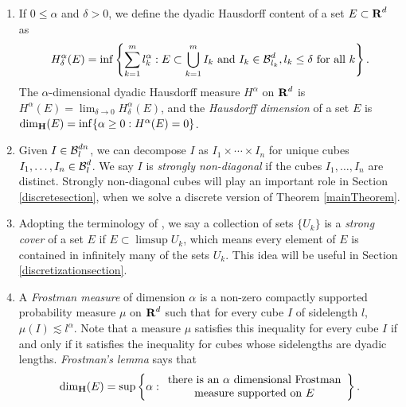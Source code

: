 \begin{enumerate}
	\item If $0 \leq \alpha$ and $\delta > 0$, we define the dyadic Hausdorff content of a set $E\subset\operatorname{\mathbf{R}}^d$ as 
	\[ H^\alpha_\delta(E) = \inf \left\{ \sum_{k = 1}^m l_k^\alpha : E \subset \bigcup_{k = 1}^m I_k\ \text{and}\ I_k \in \operatorname{\mathcal{B}}^d_{l_k}, l_k \leq \delta\ \text{for all $k$} \right\}. \]
	The $\alpha$-dimensional dyadic Hausdorff measure $H^\alpha$ on $\operatorname{\mathbf{R}}^d$ is $H^\alpha(E) = \lim_{\delta \to 0} H_\delta^\alpha(E)$, and the {\it Hausdorff dimension} of a set $E$ is $\operatorname{\dim_{\mathbf{H}}}(E) = \inf \{ \alpha \geq 0 : H^\alpha(E) = 0 \}$.
%
%
	\item \label{stronglyNonDiagonalDef}Given $I \in \operatorname{\mathcal{B}}^{dn}_l$, we can decompose $I$ as $I_1 \times \cdots \times I_n$ for unique cubes $I_1, \dots, I_n \in \operatorname{\mathcal{B}}_l^d$. We say $I$ is {\it strongly non-diagonal} if the cubes $I_1, \dots, I_n$ are distinct. Strongly non-diagonal cubes will play an important role in Section \ref{discretesection}, when we solve a discrete version of Theorem \ref{mainTheorem}.
%
%
	\item\label{strongCoverDefn} Adopting the terminology of \cite{KatzTao}, we say a collection of sets $\{ U_k \}$ is a {\it strong cover} of a set $E$ if $E \subset \limsup U_k$, which means every element of $E$ is contained in infinitely many of the sets $U_k$. This idea will be useful in Section \ref{discretizationsection}.  
%
%
	\item\label{frostmanItem} A {\it Frostman measure} of dimension $\alpha$ is a non-zero compactly supported probability measure $\mu$ on $\operatorname{\mathbf{R}}^d$ such that for every cube $I$ of sidelength $l$, $\mu(I) \lesssim l^\alpha$. Note that a measure $\mu$ satisfies this inequality for every cube $I$ if and only if it satisfies the inequality for cubes whose sidelengths are dyadic lengths. {\it Frostman's lemma} says that
	\[ \operatorname{\dim_{\mathbf{H}}}(E) = \sup \left\{ \alpha: \begin{array}{c} \text{there is an}\ \alpha\ \text{dimensional Frostman}\\
	\text{measure supported on $E$} \end{array} \right\}. \]
\end{enumerate}









